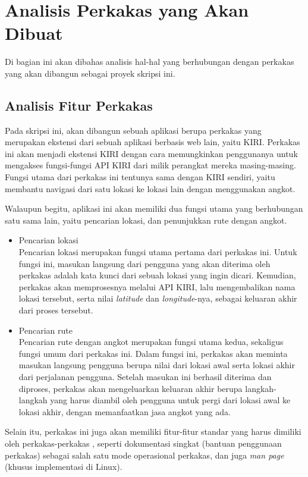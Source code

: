 \section{Analisis Perkakas yang Akan Dibuat}
\label{sec:analysis-thesisapp}

Di bagian ini akan dibahas analisis hal-hal yang berhubungan dengan perkakas yang akan dibangun sebagai proyek skripsi ini.
\vspace{-0.5em} %
\subsection{Analisis Fitur Perkakas}
\label{sec:analysis-thesisapp-features}

Pada skripsi ini, akan dibangun sebuah aplikasi berupa perkakas \cl yang merupakan ekstensi dari sebuah aplikasi berbasis web lain, yaitu KIRI. Perkakas ini akan menjadi ekstensi KIRI dengan cara memungkinkan penggunanya untuk mengakses fungsi-fungsi API KIRI dari \cl milik perangkat mereka masing-masing. Fungsi utama dari perkakas ini tentunya sama dengan KIRI sendiri, yaitu membantu navigasi dari satu lokasi ke lokasi lain dengan menggunakan angkot.

Walaupun begitu, aplikasi ini akan memiliki dua fungsi utama yang berhubungan satu sama lain, yaitu pencarian lokasi, dan penunjukkan rute dengan angkot.

\begin{itemize}
	\item Pencarian lokasi\\
	Pencarian lokasi merupakan fungsi utama pertama dari perkakas ini. Untuk fungsi ini, masukan langsung dari pengguna yang akan diterima oleh perkakas adalah kata kunci dari sebuah lokasi yang ingin dicari. Kemudian, perkakas akan memprosesnya melalui API KIRI, lalu mengembalikan nama lokasi tersebut, serta nilai \textit{latitude} dan \textit{longitude}-nya, sebagai keluaran akhir dari proses tersebut.
	\item Pencarian rute\\
	Pencarian rute dengan angkot merupakan fungsi utama kedua, sekaligus fungsi umum dari perkakas ini. Dalam fungsi ini, perkakas akan meminta masukan langsung pengguna berupa nilai \latlon dari lokasi awal serta lokasi akhir dari perjalanan pengguna. Setelah masukan ini berhasil diterima dan diproses, perkakas akan mengeluarkan keluaran akhir berupa langkah-langkah yang harus diambil oleh pengguna untuk pergi dari lokasi awal ke lokasi akhir, dengan memanfaatkan jasa angkot yang ada.
\end{itemize}
\noindent
Selain itu, perkakas ini juga akan memiliki fitur-fitur standar yang harus dimiliki oleh perkakas-perkakas \cl, seperti dokumentasi singkat (bantuan penggunaan perkakas) sebagai salah satu mode operasional perkakas, dan juga \textit{man page} (khusus implementasi di Linux).
\vspace{-0.5em} %
